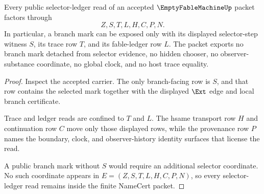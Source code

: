 \begin{theorem}
\label{thm:empty-fable-machine-nonescape}
Every public selector-ledger read of an accepted $\EmptyFableMachineUp$ packet factors through
$$
Z,S,T,L,H,C,P,N.
$$
In particular, a branch mark can be exposed only with its displayed selector-step witness $S$, its trace row $T$, and its fable-ledger row $L$. The packet exports no branch mark detached from selector evidence, no hidden chooser, no observer-substance coordinate, no global clock, and no host trace equality.
\end{theorem}
\begin{proof}
Inspect the accepted carrier. The only branch-facing row is $S$, and that row contains the selected mark together with the displayed $\Ext$ edge and local branch certificate.

Trace and ledger reads are confined to $T$ and $L$. The hsame transport row $H$ and continuation row $C$ move only those displayed rows, while the provenance row $P$ names the boundary, clock, and observer-history identity surfaces that license the read.

A public branch mark without $S$ would require an additional selector coordinate. No such coordinate appears in $E=(Z,S,T,L,H,C,P,N)$, so every selector-ledger read remains inside the finite NameCert packet.
\end{proof}





